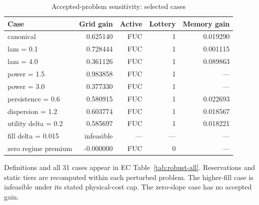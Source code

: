 \begin{table}[!ht]
\centering
\caption{Accepted-problem sensitivity: selected cases}\label{tab:robustness}
\begin{tabular}{lrrrr}\toprule
Case & Grid gain & Active & Lottery & Memory gain\\
\midrule
canonical & 0.625140 & FUC & 1 & 0.019290\\
lam = 0.1 & 0.728444 & FUC & 1 & 0.001115\\
lam = 4.0 & 0.361126 & FUC & 1 & 0.089863\\
power = 1.5 & 0.983858 & FUC & 1 & ---\\
power = 3.0 & 0.377330 & FUC & 1 & ---\\
persistence = 0.6 & 0.580915 & FUC & 1 & 0.022693\\
dispersion = 1.2 & 0.603774 & FUC & 1 & 0.018567\\
utility delta = 0.2 & 0.585697 & FUC & 1 & 0.018221\\
fill delta = 0.015 & infeasible & --- & --- & ---\\
zero regime premium & -0.000000 & FUC & 0 & ---\\
\bottomrule\end{tabular}
\par\smallskip\begin{minipage}{.98\textwidth}\small Definitions and all 31 cases appear in EC Table~\ref{tab:robust-all}. Reservations and static tiers are recomputed within each perturbed problem. The higher-fill case is infeasible under its stated physical-cost cap. The zero-slope case has no accepted gain.\end{minipage}
\end{table}
